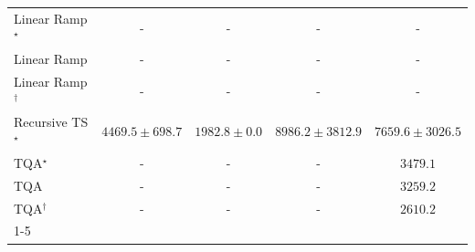 \begin{tabular}{l|cccc|}
Linear Ramp$^\star$ & {\cellcolor[HTML]{000000}} \color[HTML]{F1F1F1} {\cellcolor{white}} \color{black} - & {\cellcolor[HTML]{000000}} \color[HTML]{F1F1F1} {\cellcolor{white}} \color{black} - & {\cellcolor[HTML]{000000}} \color[HTML]{F1F1F1} {\cellcolor{white}} \color{black} - & {\cellcolor[HTML]{000000}} \color[HTML]{F1F1F1} {\cellcolor{white}} \color{black} - \\
Linear Ramp & {\cellcolor[HTML]{000000}} \color[HTML]{F1F1F1} {\cellcolor{white}} \color{black} - & {\cellcolor[HTML]{000000}} \color[HTML]{F1F1F1} {\cellcolor{white}} \color{black} - & {\cellcolor[HTML]{000000}} \color[HTML]{F1F1F1} {\cellcolor{white}} \color{black} - & {\cellcolor[HTML]{000000}} \color[HTML]{F1F1F1} {\cellcolor{white}} \color{black} - \\
Linear Ramp$^\dagger$ & {\cellcolor[HTML]{000000}} \color[HTML]{F1F1F1} {\cellcolor{white}} \color{black} - & {\cellcolor[HTML]{000000}} \color[HTML]{F1F1F1} {\cellcolor{white}} \color{black} - & {\cellcolor[HTML]{000000}} \color[HTML]{F1F1F1} {\cellcolor{white}} \color{black} - & {\cellcolor[HTML]{000000}} \color[HTML]{F1F1F1} {\cellcolor{white}} \color{black} - \\
Recursive TS$^\star$ & {\cellcolor[HTML]{9AB8D8}} \color[HTML]{000000} $4469.5\pm 698.7$ & {\cellcolor[HTML]{F2ECF5}} \color[HTML]{000000} $1982.8\pm 0.0$ & {\cellcolor[HTML]{023D60}} \color[HTML]{F1F1F1} $8986.2\pm 3812.9$ & {\cellcolor[HTML]{05659F}} \color[HTML]{F1F1F1} $7659.6\pm 3026.5$ \\
TQA$^\star$ & {\cellcolor[HTML]{000000}} \color[HTML]{F1F1F1} {\cellcolor{white}} \color{black} - & {\cellcolor[HTML]{000000}} \color[HTML]{F1F1F1} {\cellcolor{white}} \color{black} - & {\cellcolor[HTML]{000000}} \color[HTML]{F1F1F1} {\cellcolor{white}} \color{black} - & {\cellcolor[HTML]{C6CCE3}} \color[HTML]{000000} $3479.1$ \\
TQA & {\cellcolor[HTML]{000000}} \color[HTML]{F1F1F1} {\cellcolor{white}} \color{black} - & {\cellcolor[HTML]{000000}} \color[HTML]{F1F1F1} {\cellcolor{white}} \color{black} - & {\cellcolor[HTML]{000000}} \color[HTML]{F1F1F1} {\cellcolor{white}} \color{black} - & {\cellcolor[HTML]{D0D1E6}} \color[HTML]{000000} $3259.2$ \\
TQA$^\dagger$ & {\cellcolor[HTML]{000000}} \color[HTML]{F1F1F1} {\cellcolor{white}} \color{black} - & {\cellcolor[HTML]{000000}} \color[HTML]{F1F1F1} {\cellcolor{white}} \color{black} - & {\cellcolor[HTML]{000000}} \color[HTML]{F1F1F1} {\cellcolor{white}} \color{black} - & {\cellcolor[HTML]{E2DFEE}} \color[HTML]{000000} $2610.2$ \\
\cline{1-5}
\bottomrule
\end{tabular}
